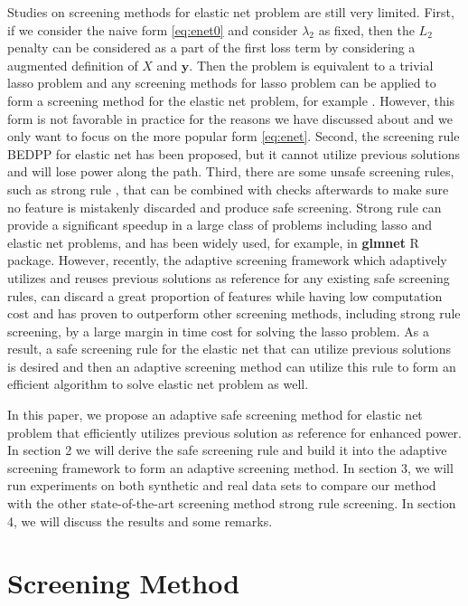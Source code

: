 Studies on screening methods for elastic net problem are still very limited. First, if we consider the naive form \eqref{eq:enet0} and consider $\lambda_2$ as fixed, then the $L_2$ penalty can be considered as a part of the first loss term by considering a augmented definition of $X$ and $\boldsymbol y$. Then the problem is equivalent to a trivial lasso problem and any screening methods for lasso problem can be applied to form a screening method for the elastic net problem, for example \citep{xu2019}. However, this form is not favorable in practice for the reasons we have discussed about and we only want to focus on the more popular form \eqref{eq:enet}. Second, the screening rule BEDPP for elastic net \citep{Zeng2021} has been proposed, but it cannot utilize previous solutions and will lose power along the path. Third, there are some unsafe screening rules, such as strong rule \citep{Tibshirani2012}, that can be combined with checks afterwards to make sure no feature is mistakenly discarded and produce safe screening. Strong rule can provide a significant speedup in a large class of problems including lasso and elastic net problems, and has been widely used, for example, in \textbf{glmnet} R package. However, recently, the adaptive screening framework \citep{wang2021adaptive} which adaptively utilizes and reuses previous solutions as reference for any existing safe screening rules, can discard a great proportion of features while having low computation cost and has proven to outperform other screening methods, including strong rule screening, by a large margin in time cost for solving the lasso problem. As a result, a safe screening rule for the elastic net that can utilize previous solutions is desired and then an adaptive screening method can utilize this rule to form an efficient algorithm to solve elastic net problem as well.

In this paper, we propose an adaptive safe screening method for elastic net problem that efficiently utilizes previous solution as reference for enhanced power. In section 2 we will derive the safe screening rule and build it into the adaptive screening framework to form an adaptive screening method. In section 3, we will run experiments on both synthetic and real data sets to compare our method with the other state-of-the-art screening method strong rule screening. In section 4, we will discuss the results and some remarks.



\section{Screening Method}
